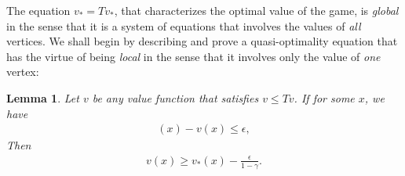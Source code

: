 \documentclass{article}
\newtheorem{lemma}{Lemma}
\begin{document}
The equation $v_*=T v_*$, that characterizes the optimal value of the game, is \emph{global} in the sense that it is a system of equations that involves the values of \emph{all} vertices. We shall begin by describing and prove a quasi-optimality equation that has the virtue of being \emph{local} in the sense that it involves only the value of \emph{one} vertex:
\begin{lemma}
  Let $v$ be any value function that satisfies $v \le Tv$.
  If for some $x$, we have
  \begin{align}
    [T^n v](x) - v(x) \le \epsilon,
  \end{align}
  Then 
  \begin{align}
    v(x) \ge v_*(x) - \frac{\epsilon}{1-\gamma}.
  \end{align}
\end{lemma}
\end{document}

